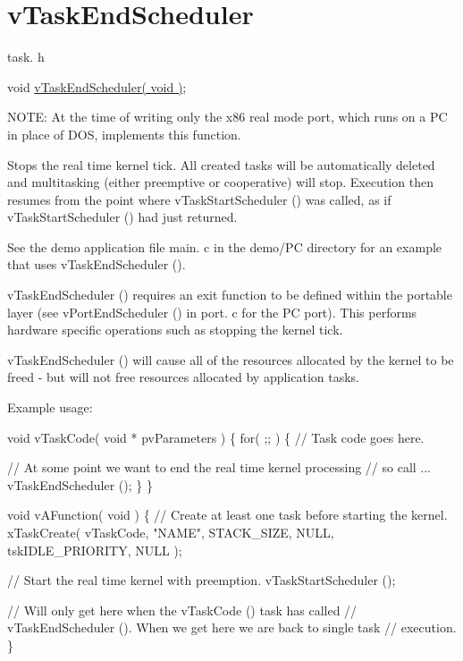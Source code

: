 \hypertarget{group__v_task_end_scheduler}{}\section{v\+Task\+End\+Scheduler}
\label{group__v_task_end_scheduler}
task. h 
\begin{DoxyPre}void \hyperlink{task_8h_a1651e13c7ccd6273f53a62425ec79a15}{vTaskEndScheduler( void )};\end{DoxyPre}


N\+O\+TE\+: At the time of writing only the x86 real mode port, which runs on a PC in place of D\+OS, implements this function.

Stops the real time kernel tick. All created tasks will be automatically deleted and multitasking (either preemptive or cooperative) will stop. Execution then resumes from the point where v\+Task\+Start\+Scheduler () was called, as if v\+Task\+Start\+Scheduler () had just returned.

See the demo application file main. c in the demo/\+PC directory for an example that uses v\+Task\+End\+Scheduler ().

v\+Task\+End\+Scheduler () requires an exit function to be defined within the portable layer (see v\+Port\+End\+Scheduler () in port. c for the PC port). This performs hardware specific operations such as stopping the kernel tick.

v\+Task\+End\+Scheduler () will cause all of the resources allocated by the kernel to be freed -\/ but will not free resources allocated by application tasks.

Example usage\+: 
\begin{DoxyPre}
void vTaskCode( void * pvParameters )
\{
    for( ;; )
    \{
     // Task code goes here.\end{DoxyPre}



\begin{DoxyPre}     // At some point we want to end the real time kernel processing
     // so call ...
     vTaskEndScheduler ();
    \}
\}\end{DoxyPre}



\begin{DoxyPre}void vAFunction( void )
\{
    // Create at least one task before starting the kernel.
    xTaskCreate( vTaskCode, "NAME", STACK\_SIZE, NULL, tskIDLE\_PRIORITY, NULL );\end{DoxyPre}



\begin{DoxyPre}    // Start the real time kernel with preemption.
    vTaskStartScheduler ();\end{DoxyPre}



\begin{DoxyPre}    // Will only get here when the vTaskCode () task has called
    // vTaskEndScheduler ().  When we get here we are back to single task
    // execution.
\}
  \end{DoxyPre}
 